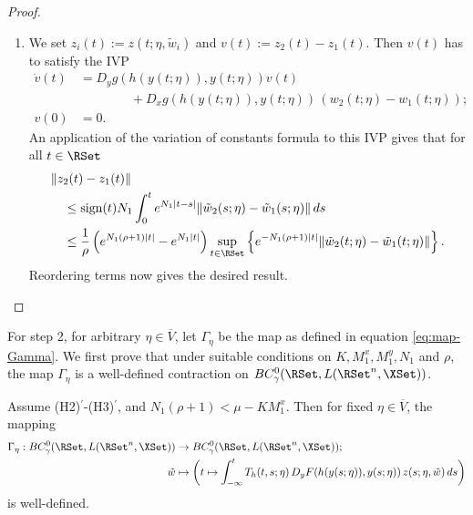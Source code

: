 \documentclass[a4paper]{siamart190516}
\newcommand{\sgn}{\text{sign}}
\begin{document}
\begin{proof}
\begin{enumerate}
\item We set $z_i(t) := z(t; \eta,\tilde{w}_i)$ and $v(t) := z_2(t) - z_1(t)$. Then $v(t)$ has to satisfy the IVP
\begin{equation*}
 \begin{aligned}
\dot{v}(t)  &=  D_y g(h(y(t;\eta)), y(t;\eta))  v(t) \\
&\qquad \qquad +  D_x g(h(y(t;\eta)), y(t;\eta)) \,  (w_2(t;\eta) - w_1(t; \eta)); \\
v(0) &=  0.
 \end{aligned}
 \end{equation*}
An application of the variation of constants formula to this IVP gives that for all $t \in \RSet$
\begin{align*}
&\| z_2(t) -z_1(t) \| \\
&\quad \leq \sgn(t) N_1 \int_0^t e^{N_1|t-s|} \| \tilde{w}_2(s;\eta) - \tilde{w}_1(s; \eta)  \| \, ds \\
&\quad \leq \frac{1}{\rho} \left( e^{N_1(\rho+1)|t|} - e^{N_1|t|} \right) \sup_{t \in \RSet} \left\{ e^{-N_1(\rho+1)|t|}  \| \tilde{w}_2(t;\eta) - \tilde{w}_1(t;\eta)   \|  \right\}. 
\end{align*}
Reordering terms now gives the desired result.
\end{enumerate}
 \end{proof}
 
 For step 2, for arbitrary $\eta \in \overline{V}$, let $\Gamma_{\eta}$ be the map as defined in equation \cref{eq:map-Gamma}. We first prove that under suitable conditions on $K, M^x_1, M^y_1, N_1$ and $\rho$, the map $\Gamma_{\eta}$ is a well-defined contraction on $BC^0_{\gamma}(\RSet, L(\RSet^n, \XSet))$.
 
 \begin{lemma}\label{lem:gamma-well-defined}
Assume (H2)$^\prime$-(H3)$^\prime$, and $N_1(\rho+1) < \mu - K M^x_1$. Then for fixed $\eta \in \overline{V}$, the mapping
\begin{equation*}
\begin{aligned}
\Gamma_{\eta} : BC^0_{\gamma}(\RSet, L(\RSet^n, \XSet)) &\rightarrow BC^0_{\gamma}(\RSet, L(\RSet^n, \XSet)); \\
			  \tilde{w} &\mapsto \left( t \mapsto \int_{-\infty}^{t} T_h(t,s;\eta) \, D_y F(h(y(s;\eta)),y(s;\eta)) \, z(s;\eta,\tilde{w}) \, ds \right)
\end{aligned}
\end{equation*}
 is well-defined.
 \end{lemma}
 
\end{document}
